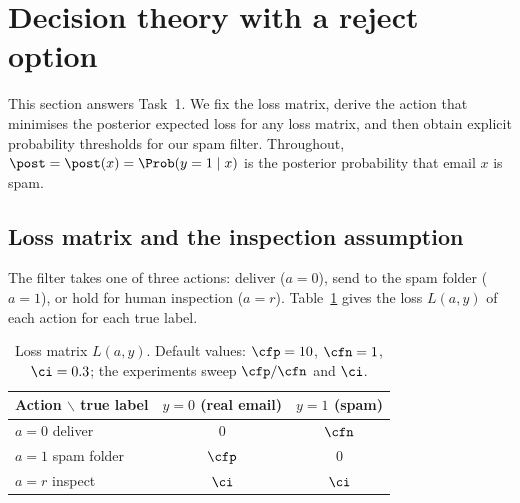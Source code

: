 \section{Decision theory with a reject option}
\label{sec:decision}

This section answers Task~1. We fix the loss matrix, derive the action that minimises the posterior
expected loss for any loss matrix, and then obtain explicit probability thresholds for our spam filter.
Throughout, $\post = \post(x) = \Prob(y=1\mid x)$ is the posterior probability that email $x$ is spam.

\subsection{Loss matrix and the inspection assumption}
\label{sec:loss-matrix}

The filter takes one of three actions: deliver ($a=0$), send to the spam folder ($a=1$), or hold for
human inspection ($a=r$). Table~\ref{tab:loss} gives the loss $L(a,y)$ of each action for each true label.

\begin{table}[ht]
\centering
\begin{tabular}{lcc}
\toprule
Action $\backslash$ true label & $y=0$ (real email) & $y=1$ (spam) \\
\midrule
$a=0$ deliver        & $0$     & $\cfn$ \\
$a=1$ spam folder    & $\cfp$  & $0$ \\
$a=r$ inspect        & $\ci$   & $\ci$ \\
\bottomrule
\end{tabular}
\caption{Loss matrix $L(a,y)$. Default values: $\cfp=10$, $\cfn=1$, $\ci=0.3$; the experiments sweep $\cfp/\cfn$ and $\ci$.}
\label{tab:loss}
\end{table}

